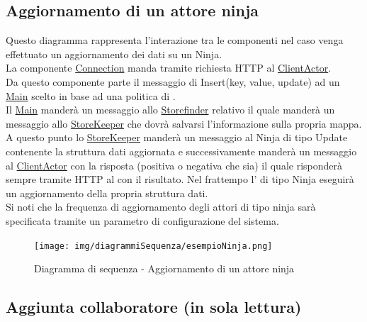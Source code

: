 \documentclass{scalatekids-article}
\begin{document}
\subsection{Aggiornamento di un attore ninja}

Questo diagramma rappresenta l'interazione tra le componenti nel caso venga
effettuato un aggiornamento dei dati su un  Ninja.\\
La componente \hyperref[sec:actorbase::driver::client::Connection]{Connection}
manda tramite richiesta HTTP al \hyperref[sec:actorbase::actorsystem::actors::clientactor::ClientActor]{ClientActor}.\\
Da questo componente parte il messaggio di Insert(key, value, update) ad un \hyperref[sec:actorbase::actorsystem::actors::main::Main]{Main}
scelto in base ad una politica di .\\
Il \hyperref[sec:actorbase::actorsystem::actors::main::Main]{Main} manderà un messaggio allo
\hyperref[sec:actorbase::actorsystem::actors::storefinder::Storefinder]{Storefinder} relativo il quale manderà un messaggio
allo \hyperref[sec:actorbase::actorsystem::actors::storekeeper::Storekeeper]{StoreKeeper} che dovrà salvarsi l'informazione sulla propria mappa.\\
A questo punto lo \hyperref[sec:actorbase::actorsystem::actors::storekeeper::Storekeeper]{StoreKeeper} manderà un messaggio al Ninja di tipo
Update contenente la struttura dati aggiornata e successivamente manderà un messaggio al
\hyperref[sec:actorbase::actorsystem::actors::clientactor::ClientActor]{ClientActor} con la risposta (positiva o negativa che sia)
il quale risponderà sempre tramite HTTP al  con il risultato.
Nel frattempo l' di tipo Ninja eseguirà un aggiornamento della propria struttura dati.\\
Si noti che la frequenza di aggiornamento degli attori di tipo ninja sarà
specificata tramite un parametro di configurazione del sistema.
\begin{figure}[H]
  \begin{center}
    \texttt{[image: img/diagrammiSequenza/esempioNinja.png]}
    \caption{Diagramma di sequenza - Aggiornamento di un attore ninja}
  \end{center}
\end{figure}

\subsection{Aggiunta collaboratore (in sola lettura)}
\end{document}
